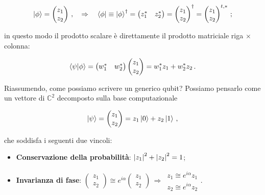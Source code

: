 \begin{equation*}
    \ket{\phi} = \begin{pmatrix} z_1 \\ z_2 \end{pmatrix} \, , \quad \Rightarrow \quad \bra{\phi} \equiv \ket{\phi}^\dagger = \begin{pmatrix} z_1^\ast & z_2^\ast \end{pmatrix} = \begin{pmatrix} z_1 \\ z_2 \end{pmatrix}^\dagger = \begin{pmatrix} z_1 \\ z_2 \end{pmatrix}^{t, \ast} \, ;
\end{equation*}

\noindent in questo modo il prodotto scalare è direttamente il prodotto matriciale riga $\times$ colonna: 

\begin{equation*}
    \braket{\psi}{\phi} = \begin{pmatrix} w_1^\ast & w_2^\ast \end{pmatrix} \begin{pmatrix} z_1 \\ z_2 \end{pmatrix} = w_1^\ast z_1 + w_2^\ast z_2 \, .
\end{equation*}

\noindent Riassumendo, come possiamo scrivere un generico qubit? Possiamo pensarlo come un vettore di $\mathbb{C}^2$ decomposto sulla base computazionale

\begin{equation*}
    \ket{\psi} = \begin{pmatrix} z_1 \\ z_2 \end{pmatrix} = z_1 \ket{0} + z_2 \ket{1} \, ,
\end{equation*}

\noindent che soddisfa i seguenti due vincoli:
\begin{itemize}
    \item \textbf{Conservazione della probabilità}: $\abs{z_1}^2 + \abs{z_2}^2 = 1$;
    \item \textbf{Invarianza di fase}: $ \begin{pmatrix} z_1 \\ z_2 \end{pmatrix} \cong e^{i\alpha} \begin{pmatrix} z_1 \\ z_2 \end{pmatrix} \, \Rightarrow \, \begin{matrix} z_1 \cong e^{i\alpha} z_1 \\ z_2 \cong e^{i\alpha} z_2 \end{matrix}$.
\end{itemize}

